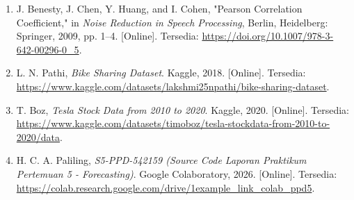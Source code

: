 \documentclass[a4paper,oneside,11pt]{book}
\begin{document}
\begin{enumerate}
    \item \label{benesty} J. Benesty, J. Chen, Y. Huang, and I. Cohen, "Pearson Correlation Coefficient," in \textit{Noise Reduction in Speech Processing}, Berlin, Heidelberg: Springer, 2009, pp. 1--4. [Online]. Tersedia: \url{https://doi.org/10.1007/978-3-642-00296-0_5}.
    
    \item \label{kaggleBikesharing} L. N. Pathi, \textit{Bike Sharing Dataset}. Kaggle, 2018. [Online]. Tersedia: \url{https://www.kaggle.com/datasets/lakshmi25npathi/bike-sharing-dataset}.
    
    \item \label{kaggleTesla} T. Boz, \textit{Tesla Stock Data from 2010 to 2020}. Kaggle, 2020. [Online]. Tersedia: \url{https://www.kaggle.com/datasets/timoboz/tesla-stockdata-from-2010-to-2020/data}.
    
    \item \label{colabLaporan} H. C. A. Paliling, \textit{S5-PPD-542159 (Source Code Laporan Praktikum Pertemuan 5 - Forecasting)}. Google Colaboratory, 2026. [Online]. Tersedia: \url{https://colab.research.google.com/drive/1example_link_colab_ppd5}.
\end{enumerate}
\end{document}
